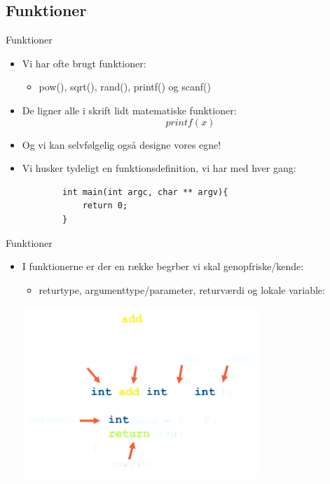 \documentclass{beamer}
\begin{document}
\subsection{Funktioner}

\begin{frame}[fragile]{Funktioner}
	\begin{itemize}
		\item{Vi har ofte brugt funktioner:}
		\begin{itemize}
			\item{{\color{C_darkblue}pow}(), {\color{C_darkblue}sqrt}(), {\color{C_darkblue}rand}(), {\color{C_darkblue}printf}() og {\color{C_darkblue}scanf}()}
		\end{itemize}
		\item{De ligner alle i skrift lidt matematiske funktioner:}
		\begin{equation}
      	printf(x)
    		\end{equation}
    		\item{Og vi kan selvfølgelig også designe vores egne!}
    		\item{Vi husker tydeligt en funktionsdefinition, vi har med hver gang:}
    		\begin{lstlisting}
		int main(int argc, char ** argv){
			return 0;
		}
		\end{lstlisting}
	\end{itemize}
\end{frame}


\begin{frame}[fragile]{Funktioner}
	\begin{itemize}
		\item{I funktionerne er der en række begrber vi skal genopfriske/kende:}
		\begin{itemize}
			\item{{\color{dkgreen}returtype}, {\color{dkgreen}argumenttype/parameter}, {\color{dkgreen}returværdi} og {\color{dkgreen}lokale variable}:}
		\end{itemize}
	\begin{center}
		\includegraphics[width=0.7\textwidth]{assets/function_description.png}
	\end{center}
	\end{itemize}
\end{frame}
\end{document}
